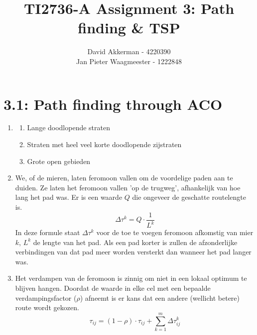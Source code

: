 \documentclass[a4paper,10pt,fleqn]{article}
\title{TI2736-A Assignment 3: Path finding \& TSP}
\author{
    David Akkerman - 4220390 \\
    Jan Pieter Waagmeester - 1222848 \\
}
\begin{document}
\maketitle

\section*{3.1: Path finding through ACO}
\begin{enumerate}[1.]
    \item
        \begin{enumerate}[-]
            \item Lange doodlopende straten
            \item Straten met heel veel korte doodlopende zijstraten
            \item Grote open gebieden
        \end{enumerate}


    \item We, of de mieren, laten feromoon vallen om de voordelige paden aan te duiden. Ze laten het feromoon vallen 'op de trugweg', afhankelijk van hoe lang het pad was. Er is een waarde $Q$ die ongeveer de geschatte routelengte is.
    $$\Delta\tau^k = Q \cdot \frac{1}{L^k}$$
    In deze formule staat $\Delta\tau^k$ voor de toe te voegen feromoon afkomstig van mier $k$, $L^k$ de lengte van het pad. Als een pad korter is zullen de afzonderlijke verbindingen van dat pad meer worden versterkt dan wanneer het pad langer was.

    \item Het verdampen van de feromoon is zinnig om niet in een lokaal optimum te blijven hangen. Doordat de waarde in elke cel met een bepaalde verdampingsfactor ($\rho$) afneemt is er kans dat een andere (wellicht betere) route wordt gekozen.
    $$\tau_{ij} = (1 -\rho) \cdot \tau_{ij} + \sum_{k=1}^m \Delta\tau_{ij}^k$$


\end{enumerate}
\end{document}
